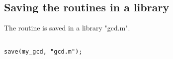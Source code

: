 \documentclass[a4paper,10pt]{article}
\begin{document}
\subsection{Saving the routines in a library}

The routine is saved in a library "gcd.m".

\begin{lstlisting}[name=gcd]

save(my_gcd, "gcd.m");

\end{lstlisting}
\end{document}

